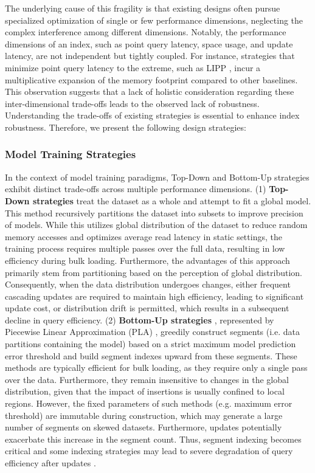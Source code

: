 The underlying cause of this fragility is that existing designs often pursue specialized optimization of single or few performance dimensions, neglecting the complex interference among different dimensions. Notably, the performance dimensions of an index, such as point query latency, space usage, and update latency, are not independent but tightly coupled. For instance, strategies that minimize point query latency to the extreme, such as LIPP \cite{lipp21}, incur a multiplicative expansion of the memory footprint compared to other baselines\cite{learned23}. This observation suggests that a lack of holistic consideration regarding these inter-dimensional trade-offs leads to the observed lack of robustness. Understanding the trade-offs of existing strategies is essential to enhance index robustness. Therefore, we present the following design strategies:

\subsubsection{Model Training Strategies}
In the context of model training paradigms, Top-Down and Bottom-Up strategies exhibit distinct trade-offs across multiple performance dimensions. (1) \textbf{Top-Down strategies} \cite{case18, alex20, swix24} treat the dataset as a whole and attempt to fit a global model. This method recursively partitions the dataset into subsets to improve precision of models. While this utilizes global distribution of the dataset to reduce random memory accesses and optimizes average read latency in static settings, the training process requires multiple passes over the full data, resulting in low efficiency during bulk loading. Furthermore, the advantages of this approach primarily stem from partitioning based on the perception of global distribution. Consequently, when the data distribution undergoes changes, either frequent cascading updates are required to maintain high efficiency, leading to significant update cost, or distribution drift is permitted, which results in a subsequent decline in query efficiency. (2) \textbf{Bottom-Up strategies} \cite{radixspline20, pgm20, finedex21}, represented by Piecewise Linear Approximation (PLA) \cite{pgm20}, greedily construct segments (i.e. data partitions containing the model) based on a strict maximum model prediction error threshold and build segment indexes upward from these segments. These methods are typically efficient for bulk loading, as they require only a single pass over the data. Furthermore, they remain insensitive to changes in the global distribution, given that the impact of insertions is usually confined to local regions. However, the fixed parameters of such methods (e.g. maximum error threshold) are immutable during construction, which may generate a large number of segments on skewed datasets. Furthermore, updates potentially exacerbate this increase in the segment count. Thus, segment indexing becomes critical and some indexing strategies may lead to severe degradation of query efficiency after updates \cite{pgm20, learned23}.


